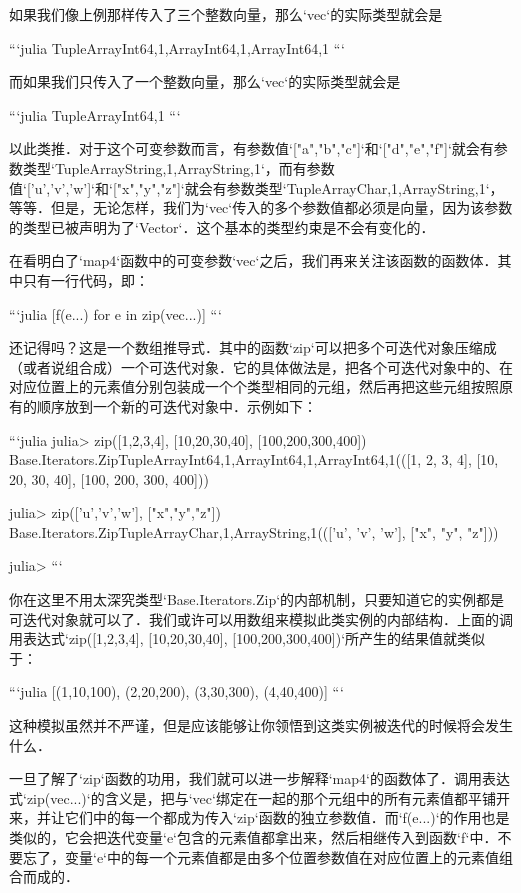 如果我们像上例那样传入了三个整数向量，那么`vec`的实际类型就会是

```julia
Tuple{Array{Int64,1},Array{Int64,1},Array{Int64,1}}
```

而如果我们只传入了一个整数向量，那么`vec`的实际类型就会是

```julia
Tuple{Array{Int64,1}}
```

以此类推．对于这个可变参数而言，有参数值`["a","b","c"]`和`["d","e","f"]`就会有参数类型`Tuple{Array{String,1},Array{String,1}}`，而有参数值`['u','v','w']`和`["x","y","z"]`就会有参数类型`Tuple{Array{Char,1},Array{String,1}}`，等等．但是，无论怎样，我们为`vec`传入的多个参数值都必须是向量，因为该参数的类型已被声明为了`Vector`．这个基本的类型约束是不会有变化的．

在看明白了`map4`函数中的可变参数`vec`之后，我们再来关注该函数的函数体．其中只有一行代码，即：

```julia
[f(e...) for e in zip(vec...)]
```

还记得吗？这是一个数组推导式．其中的函数`zip`可以把多个可迭代对象压缩成（或者说组合成）一个可迭代对象．它的具体做法是，把各个可迭代对象中的、在对应位置上的元素值分别包装成一个个类型相同的元组，然后再把这些元组按照原有的顺序放到一个新的可迭代对象中．示例如下：

```julia
julia> zip([1,2,3,4], [10,20,30,40], [100,200,300,400])
Base.Iterators.Zip{Tuple{Array{Int64,1},Array{Int64,1},Array{Int64,1}}}(([1, 2, 3, 4], [10, 20, 30, 40], [100, 200, 300, 400]))

julia> zip(['u','v','w'], ["x","y","z"])
Base.Iterators.Zip{Tuple{Array{Char,1},Array{String,1}}}((['u', 'v', 'w'], ["x", "y", "z"]))

julia> 
```

你在这里不用太深究类型`Base.Iterators.Zip`的内部机制，只要知道它的实例都是可迭代对象就可以了．我们或许可以用数组来模拟此类实例的内部结构．上面的调用表达式`zip([1,2,3,4], [10,20,30,40], [100,200,300,400])`所产生的结果值就类似于：

```julia
[(1,10,100), (2,20,200), (3,30,300), (4,40,400)]
```

这种模拟虽然并不严谨，但是应该能够让你领悟到这类实例被迭代的时候将会发生什么．

一旦了解了`zip`函数的功用，我们就可以进一步解释`map4`的函数体了．调用表达式`zip(vec...)`的含义是，把与`vec`绑定在一起的那个元组中的所有元素值都平铺开来，并让它们中的每一个都成为传入`zip`函数的独立参数值．而`f(e...)`的作用也是类似的，它会把迭代变量`e`包含的元素值都拿出来，然后相继传入到函数`f`中．不要忘了，变量`e`中的每一个元素值都是由多个位置参数值在对应位置上的元素值组合而成的．

